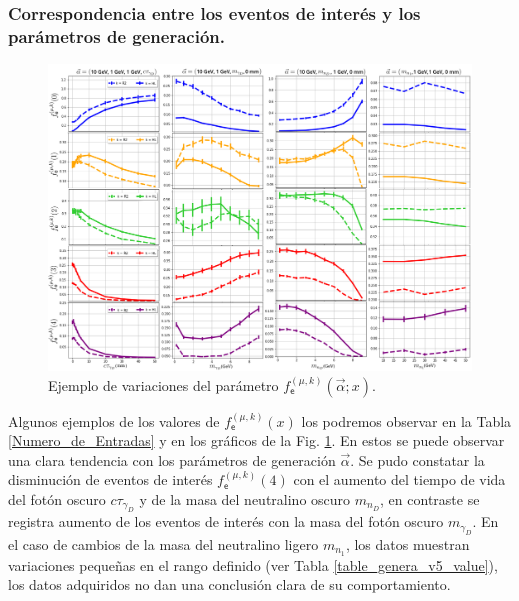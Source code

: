 \subsubsection{Correspondencia entre los eventos de interés y los parámetros de generación.}
\begin{figure}[!t]
\centering
\includegraphics[width=.9\textwidth]{Cap4/imagenes/Comparacion_Distribucion_Entries0.png}
\caption{Ejemplo de variaciones del parámetro $f^{(\mu, k)}_\textsf{e} (\vec{\alpha}; x)$.}
\label{entradasALL}
\end{figure}

Algunos ejemplos de los valores de $f^{(\mu, k)}_\textsf{e} (x)$ los podremos observar en la Tabla \ref{Numero_de_Entradas} y en los gráficos de la Fig. \ref{entradasALL}. En estos se puede observar una clara tendencia con los parámetros de generación $\vec{\alpha}$. Se pudo constatar la disminución de eventos de interés $f^{(\mu, k)}_\textsf{e} (4)$ con el aumento del tiempo de vida del fotón oscuro $c\tau_{\gamma_D}$ y de la masa del neutralino oscuro $m_{n_D}$, en contraste se registra aumento de los eventos de interés con la masa del fotón oscuro $m_{\gamma_D}$. En el caso de cambios de la masa del neutralino ligero $m_{n_1}$, los datos muestran variaciones pequeñas en el rango definido (ver Tabla \ref{table_genera_v5_value}), los datos adquiridos no dan una conclusión clara de su comportamiento.




